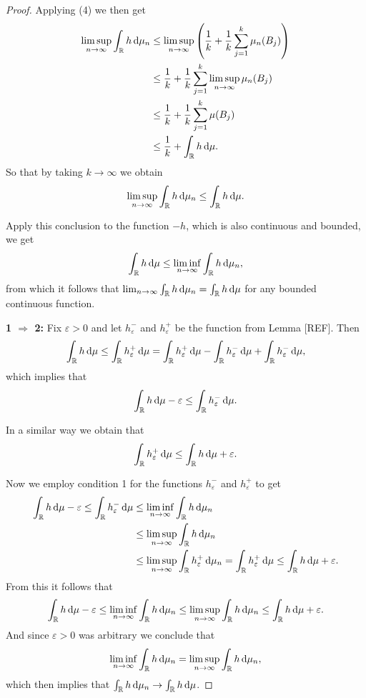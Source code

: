\begin{proof}
Applying (4) we then get
\begin{align*}
	\limsup_{n \to \infty} \int_{\mathbb R} h \, \mathrm{d} \mu_n
	&\le  \limsup_{n \to \infty} \left(\frac{1}{k} + \frac{1}{k} \sum_{j = 1}^k \mu_n(B_j) \right)\\
	&\le \frac{1}{k} + \frac{1}{k} \sum_{j = 1}^k \limsup_{n \to \infty} \mu_n(B_j)\\
	&\le \frac{1}{k} + \frac{1}{k} \sum_{j = 1}^k \mu(B_j) \\
	&\le \frac{1}{k} + \int_{\mathbb R} h \, \mathrm{d} \mu.
\end{align*}
So that by taking $k \to \infty$ we obtain
\[
	\limsup_{n \to \infty} \int_{\mathbb R} h \, \mathrm{d} \mu_n \le \int_{\mathbb R} h \, \mathrm{d} \mu.
\]

Apply this conclusion to the function $-h$, which is also continuous and bounded, we get
\[
	\int_{\mathbb R} h \, \mathrm{d} \mu \le \liminf_{n \to \infty} \int_{\mathbb R} h \, \mathrm{d} \mu_n,
\]
from which it follows that $\lim_{n \to \infty} \int_{\mathbb R} h \, \mathrm{d} \mu_n = \int_{\mathbb R} h \, \mathrm{d} \mu$ for any bounded continuous function.

\textbf{1 $\Rightarrow$ 2:} Fix $\varepsilon > 0$ and let $h^-_\varepsilon$ and $h^+_\varepsilon$ be the function from Lemma [REF]. Then
\[
	\int_{\mathbb R} h \, \mathrm{d} \mu \le \int_{\mathbb R} h^+_\varepsilon \, \mathrm{d} \mu 
	= \int_{\mathbb R} h^+_\varepsilon \, \mathrm{d} \mu - \int_{\mathbb R} h^-_\varepsilon \, \mathrm{d} \mu
	+ \int_{\mathbb R} h^-_\varepsilon \, \mathrm{d} \mu,
\]
which implies that
\[
	 \int_{\mathbb R} h \, \mathrm{d} \mu -\varepsilon \le \int_{\mathbb R} h^-_\varepsilon \, \mathrm{d} \mu.
\]

In a similar way we obtain that
\[
	\int_{\mathbb R} h^+_\varepsilon \, \mathrm{d} \mu \le \int_{\mathbb R} h \, \mathrm{d} \mu +\varepsilon.
\]

Now we employ condition 1 for the functions $h^-_\varepsilon$ and $h^+_\varepsilon$ to get
\begin{align*}
	\int_{\mathbb R} h \, \mathrm{d} \mu -\varepsilon \le \int_{\mathbb R} h^-_\varepsilon \, \mathrm{d} \mu
	&\le \liminf_{n \to \infty} \int_{\mathbb R} h \, \mathrm{d} \mu_n \\
	&\le \limsup_{n \to \infty} \int_{\mathbb R} h \, \mathrm{d} \mu_n\\
	&\le \limsup_{n \to \infty}\int_{\mathbb R} h^+_\varepsilon \, \mathrm{d} \mu_n
	= \int_{\mathbb R} h^+_\varepsilon \, \mathrm{d} \mu \le \int_{\mathbb R} h \, \mathrm{d} \mu +\varepsilon.
\end{align*}
From this it follows that
\[
	\int_{\mathbb R} h \, \mathrm{d} \mu -\varepsilon \le \liminf_{n \to \infty} \int_{\mathbb R} h \, \mathrm{d} \mu_n
	\le \limsup_{n \to \infty} \int_{\mathbb R} h \, \mathrm{d} \mu_n \le \int_{\mathbb R} h \, \mathrm{d} \mu +\varepsilon.
\]
And since $\varepsilon > 0$ was arbitrary we conclude that
\[
	\liminf_{n \to \infty} \int_{\mathbb R} h \, \mathrm{d} \mu_n = \limsup_{n \to \infty} \int_{\mathbb R} h \, \mathrm{d} \mu_n,
\]
which then implies that $\int_{\mathbb R} h \, \mathrm{d} \mu_n \to \int_{\mathbb R} h \, \mathrm{d} \mu$.


\end{proof}

